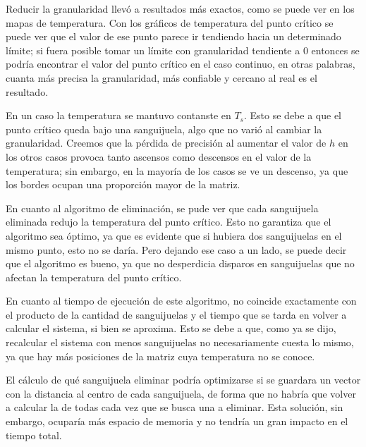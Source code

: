 \documentclass[a4paper]{article}
\begin{document}
Reducir la granularidad llevó a resultados más exactos, como se puede ver en los mapas de temperatura. Con los gráficos de temperatura del punto crítico se puede ver que el valor de ese punto parece ir tendiendo hacia un determinado límite; si fuera posible tomar un límite con granularidad tendiente a 0 entonces se podría encontrar el valor del punto crítico en el caso continuo, en otras palabras, cuanta más precisa la granularidad, más confiable y cercano al real es el resultado.

En un caso la temperatura se mantuvo contanste en $T_s$. Esto se debe a que el punto crítico queda bajo una sanguijuela, algo que no varió al cambiar la granularidad. 
Creemos que la pérdida de precisión al aumentar el valor de $h$ en los otros casos provoca tanto ascensos como descensos en el valor de la temperatura; sin embargo, en la mayoría de los casos se ve un descenso, ya que los bordes ocupan una proporción mayor de la matriz.

En cuanto al algoritmo de eliminación, se pude ver que cada sanguijuela eliminada redujo la temperatura del punto crítico. Esto no garantiza que el algoritmo sea óptimo, ya que es evidente que si hubiera dos sanguijuelas en el mismo punto, esto no se daría. Pero dejando ese caso a un lado, se puede decir que el algoritmo es bueno, ya que no desperdicia disparos en sanguijuelas que no afectan la temperatura del punto crítico.

En cuanto al tiempo de ejecución de este algoritmo, no coincide exactamente con el producto de la cantidad de sanguijuelas y el tiempo que se tarda en volver a calcular el sistema, si bien se aproxima. Esto se debe a que, como ya se dijo, recalcular el sistema con menos sanguijuelas no necesariamente cuesta lo mismo, ya que hay más posiciones de la matriz cuya temperatura no se conoce.

El cálculo de qué sanguijuela eliminar podría optimizarse si se guardara un vector con la distancia al centro de cada sanguijuela, de forma que no habría que volver a calcular la de todas cada vez que se busca una a eliminar. Esta solución, sin embargo, ocuparía más espacio de memoria y no tendría un gran impacto en el tiempo total.\\
\end{document}
